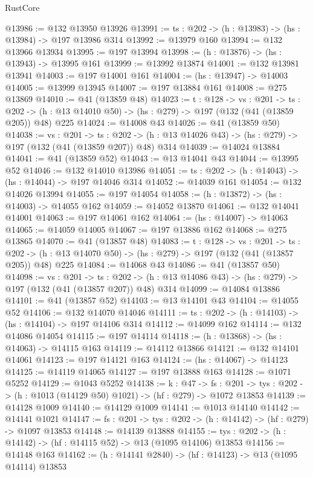 \begin{lexlean}{RustCore}
\begin{coremodule}
@13986 := @132 @13950 @13926
@13991 := {ts : @202} -> (h : @13983) -> (hs : @13984) -> @197 @13986 @314
@13992 := @13979 @160
@13994 := @132 @13966 @13934
@13995 := @197 @13994
@13998 := (h : @13876) -> (hs : @13943) -> @13995 @161
@13999 := @13992 @13874
@14001 := @132 @13981 @13941
@14003 := @197 @14001 @161
@14004 := (hs : @13947) -> @14003
@14005 := @13999 @13945
@14007 := @197 @13884 @161
@14008 := @275 @13869
@14010 := @41 (@13859 @48)
@14023 := {t : @128} ->
  {vs : @201} ->
  {ts : @202} -> (h : @13 @14010 @50) -> (hs : @279) -> @197 (@132 (@41 (@13859 @205)) @48) @225
@14024 := @14008 @43
@14026 := @41 (@13859 @50)
@14038 := {vs : @201} ->
  {ts : @202} -> (h : @13 @14026 @43) -> (hs : @279) -> @197 (@132 (@41 (@13859 @207)) @48) @314
@14039 := @14024 @13884
@14041 := @41 (@13859 @52)
@14043 := @13 @14041 @43
@14044 := @13995 @52
@14046 := @132 @14010 @13986
@14051 := {ts : @202} -> (h : @14043) -> (hs : @14044) -> @197 @14046 @314
@14052 := @14039 @161
@14054 := @132 @14026 @13994
@14055 := @197 @14054
@14058 := (h : @13872) -> (hs : @14003) -> @14055 @162
@14059 := @14052 @13870
@14061 := @132 @14041 @14001
@14063 := @197 @14061 @162
@14064 := (hs : @14007) -> @14063
@14065 := @14059 @14005
@14067 := @197 @13886 @162
@14068 := @275 @13865
@14070 := @41 (@13857 @48)
@14083 := {t : @128} ->
  {vs : @201} ->
  {ts : @202} -> (h : @13 @14070 @50) -> (hs : @279) -> @197 (@132 (@41 (@13857 @205)) @48) @225
@14084 := @14068 @43
@14086 := @41 (@13857 @50)
@14098 := {vs : @201} ->
  {ts : @202} -> (h : @13 @14086 @43) -> (hs : @279) -> @197 (@132 (@41 (@13857 @207)) @48) @314
@14099 := @14084 @13886
@14101 := @41 (@13857 @52)
@14103 := @13 @14101 @43
@14104 := @14055 @52
@14106 := @132 @14070 @14046
@14111 := {ts : @202} -> (h : @14103) -> (hs : @14104) -> @197 @14106 @314
@14112 := @14099 @162
@14114 := @132 @14086 @14054
@14115 := @197 @14114
@14118 := (h : @13868) -> (hs : @14063) -> @14115 @163
@14119 := @14112 @13866
@14121 := @132 @14101 @14061
@14123 := @197 @14121 @163
@14124 := (hs : @14067) -> @14123
@14125 := @14119 @14065
@14127 := @197 @13888 @163
@14128 := @1071 @5252
@14129 := @1043 @5252
@14138 := {k : @47} ->
  {fs : @201} -> {tys : @202} -> (h : @1013 (@14129 @50) @1021) -> (hf : @279) -> @1072 @13853
@14139 := @14128 @1009
@14140 := @14129 @1009
@14141 := @1013 @14140
@14142 := @14141 @1021
@14147 := {fs : @201} -> {tys : @202} -> (h : @14142) -> (hf : @279) -> @1097 @13853
@14148 := @14139 @13888
@14155 := {tys : @202} -> (h : @14142) -> (hf : @14115 @52) -> @13 (@1095 @14106) @13853
@14156 := @14148 @163
@14162 := (h : @14141 @2840) -> (hf : @14123) -> @13 (@1095 @14114) @13853

\end{coremodule}
\end{lexlean}
